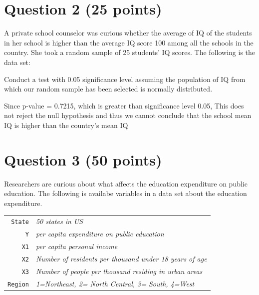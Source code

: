 \documentclass[12pt,letterpaper]{article}
\begin{document}
	\vspace{1cm}
	\section*{Question 2 (25 points)}
	A private school counselor was curious  whether  the average of IQ of the students in her school is higher than the average IQ score 100 among all the schools in the country. She took a random sample of 25 students' IQ scores. The following is the data set:
	\vspace{.5cm}
	  
	\vspace{.5cm}
	
	\noindent Conduct a test with 0.05 significance level assuming the population of IQ from which our random sample has been selected is normally distributed. 
	
	\vspace{.5cm}
	 
	Since p-value = 0.7215, which is greater than significance level 0.05, This does not reject the null hypothesis and thus we cannot conclude that the school mean IQ is higher than the country's mean IQ	
	\vspace{1cm}
		

	
	\section*{Question 3 (50 points)}
	
	\noindent Researchers are curious about what affects the education expenditure on public education. The following is availabe variables in a data set about the education expenditure. \\
	\vspace{.5cm}
	
	
	\begin{tabular}{r|l}
		\texttt{State} &\emph{50 states in US} \\
		\texttt{Y} & \emph{per capita expenditure on public education}\\
		\texttt{X1} &\emph{per capita personal income} \\
		\texttt{X2} &  \emph{Number of residents per thousand under 18 years of age}\\
		\texttt{X3} &  \emph{Number of people per thousand residing in urban areas} \\
		\texttt{Region} &  \emph{1=Northeast, 2= North Central, 3= South, 4=West} \\
	\end{tabular}
	
\end{document}
